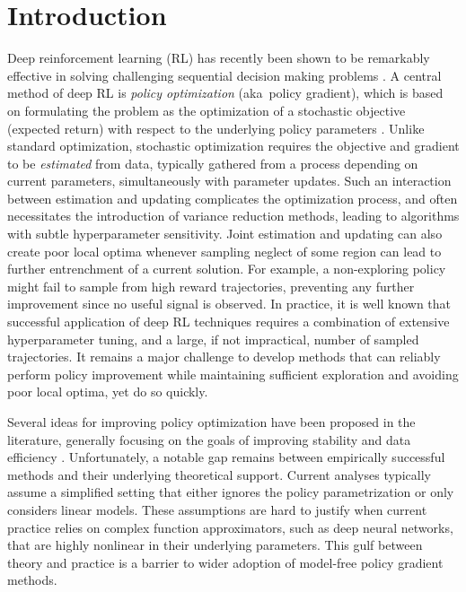 
\section{Introduction}
\label{sec:intro}


Deep reinforcement learning (RL) has recently
been shown to be remarkably effective in solving
challenging sequential decision making problems
\citep{schulman2015trust,mnih2015human,silver2016mastering}.
A central method of deep RL is \emph{policy optimization}
(aka\ policy gradient),
which is based on formulating the problem
as the optimization of a stochastic objective (expected return)
with respect to the underlying policy parameters
\citep{williams1991function,williams1992simple,sutton1998reinforcement}.
Unlike standard optimization,
stochastic optimization requires the objective and gradient to be 
\emph{estimated} from data,
typically gathered from a process depending on current parameters, 
simultaneously with parameter updates.
Such an interaction between estimation and updating
complicates the optimization process,
and often necessitates the introduction of variance reduction methods,
leading to algorithms with subtle hyperparameter sensitivity.
Joint estimation and updating can also create poor local optima
whenever sampling neglect of some region
can lead to further entrenchment of a current solution.
For example, a non-exploring policy might fail to sample from high
reward trajectories,
preventing any further improvement since no useful signal is observed.
In practice, it is well known that successful application of deep RL techniques
requires a combination of extensive hyperparameter tuning,
and a large, if not impractical, number of sampled trajectories.
It remains a major challenge to develop methods that can reliably
perform policy improvement while maintaining sufficient exploration
and avoiding poor local optima, yet do so quickly.

Several ideas for improving policy optimization have been proposed
in the literature, 
generally focusing on the goals of improving stability and data efficiency
\citep{peters2010relative,van2015learning,fox2015taming,schulman2015trust,montgomery2016guided,nachum2017bridging,nachum2017trust,tangkaratt2017guide,abdolmaleki2018maximum,haarnoja2018soft}. 
Unfortunately, a notable gap remains between empirically successful methods 
and their underlying theoretical support.
Current analyses typically assume a simplified setting that either ignores the 
policy parametrization or only considers linear models.
These assumptions are hard to justify when current practice relies on 
complex function approximators, such as deep neural networks,
that are highly nonlinear in their underlying parameters.
This gulf between theory and practice is
a barrier to wider adoption of model-free policy gradient methods.

